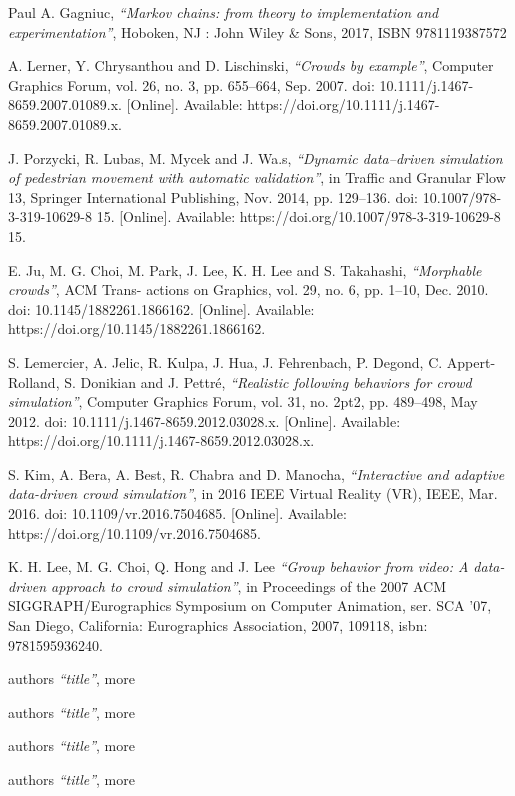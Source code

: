 \documentclass{standalone}
\begin{document}
\begin{thebibliography}{99}
Paul A. Gagniuc,
  \textit{“Markov chains: from theory to implementation and experimentation”}, 
Hoboken, NJ : John Wiley \& Sons, 
2017,
ISBN 9781119387572

A. Lerner, Y. Chrysanthou and D. Lischinski, 
  \textit{“Crowds by example”}, 
  Computer Graphics Forum, vol. 26, no. 3, pp. 655–664, 
  Sep. 2007. 
  doi: 10.1111/j.1467-8659.2007.01089.x. 
  [Online]. Available: https://doi.org/10.1111/j.1467-8659.2007.01089.x.

J. Porzycki, R. Lubas, M. Mycek and J. Wa.s, 
  \textit{“Dynamic data–driven simulation of pedestrian movement with automatic validation”}, 
  in Traffic and Granular Flow 13, Springer International Publishing, 
  Nov. 2014, pp. 129–136. 
  doi: 10.1007/978-3-319-10629-8 15. 
  [Online]. Available: https://doi.org/10.1007/978-3-319-10629-8 15.

E. Ju, M. G. Choi, M. Park, J. Lee, K. H. Lee and S. Takahashi,
  \textit{“Morphable crowds”}, 
ACM Trans- actions on Graphics, vol. 29, no. 6, pp. 1–10, 
Dec. 2010. 
doi: 10.1145/1882261.1866162. 
[Online]. Available: https://doi.org/10.1145/1882261.1866162.

S. Lemercier, A. Jelic, R. Kulpa, J. Hua, J. Fehrenbach, P. Degond, C. Appert-Rolland, S. Donikian and J. Pettré,
  \textit{“Realistic following behaviors for crowd simulation”}, 
  Computer Graphics Forum, vol. 31, no. 2pt2, pp. 489–498, 
  May 2012. 
  doi: 10.1111/j.1467-8659.2012.03028.x. 
  [Online]. Available: https://doi.org/10.1111/j.1467-8659.2012.03028.x.

S. Kim, A. Bera, A. Best, R. Chabra and D. Manocha,
  \textit{“Interactive and adaptive data-driven crowd simulation”}, 
  in 2016 IEEE Virtual Reality (VR), IEEE, 
  Mar. 2016. 
  doi: 10.1109/vr.2016.7504685. 
  [Online]. Available: https://doi.org/10.1109/vr.2016.7504685.
 
K. H. Lee, M. G. Choi, Q. Hong and J. Lee
  \textit{“Group behavior from video: A data-driven approach to crowd simulation”}, 
in Proceedings of the 2007 ACM SIGGRAPH/Eurographics Symposium on Computer Animation, 
ser. SCA ’07, San Diego, California: Eurographics Association, 2007, 109118, 
isbn: 9781595936240.



authors 
  \textit{“title”}, 
more


authors 
  \textit{“title”}, 
more


authors 
  \textit{“title”}, 
more


authors 
  \textit{“title”}, 
more









\end{thebibliography}


\printbibliography
\end{document}
